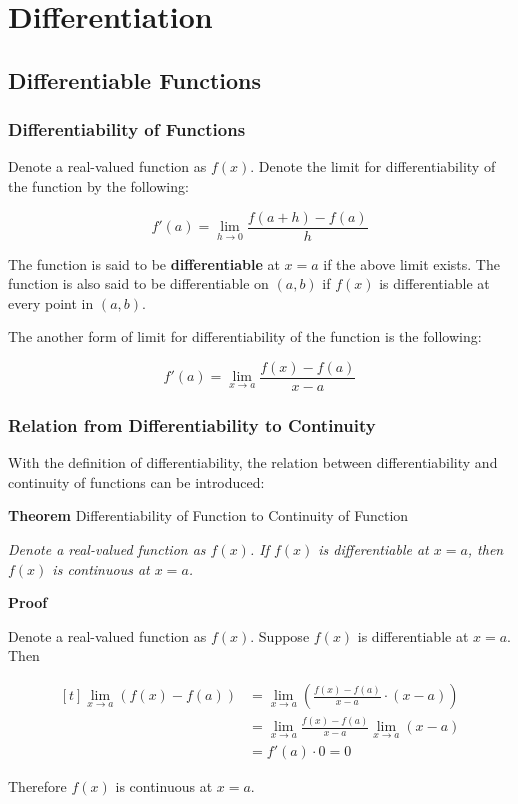 \documentclass[a4paper,12pt]{article}
\newcommand{\s}{\vspace{1mm}}
\newcommand{\n}{\vspace{3mm}}
\newenvironment{block}[4][Block]{ %
\begin{list}{}{
  \setlength{\leftmargin}{0mm}
  \setlength{\rightmargin}{0mm}
  \setlength{\topsep}{0mm}
  \setlength{\partopsep}{0mm}
  \parsep\parskip
  \setlength{\itemsep}{-\parsep}
  }
  \needspace{\baselineskip}
  \item \textbf{#2 #3} \hspace{1mm} #4
  \vspace{1mm}
  \item
  }
{
\end{list}
}
\begin{document}
\pagebreak

\section{Differentiation}
\subsection{Differentiable Functions}
\subsubsection{Differentiability of Functions}
Denote a real-valued function as $f(x)$. Denote the limit for differentiability of the function by the following:

$$f'(a)=\lim_{h\to 0}\frac{f(a+h)-f(a)}{h}$$\s

The function is said to be \textbf{differentiable} at $x=a$ if the above limit exists. The function is also said to be differentiable on $(a,b)$ if $f(x)$ is differentiable at every point in $(a,b)$.\n

The another form of limit for differentiability of the function is the following:

$$f'(a)=\lim_{x\to a}\frac{f(x)-f(a)}{x-a}$$

\subsubsection{Relation from Differentiability to Continuity}
With the definition of differentiability, the relation between differentiability and continuity of functions can be introduced:\n

\begin{block}{Theorem}{}{Differentiability of Function to Continuity of Function}
  \textit{Denote a real-valued function as $f(x)$. If $f(x)$ is differentiable at $x=a$, then $f(x)$ is continuous at $x=a$.}
\end{block}\n

\begin{block}{Proof}{}{}
  Denote a real-valued function as $f(x)$. Suppose $f(x)$ is differentiable at $x=a$. Then

  $$\begin{aligned}[t]
    \lim_{x\to a}(f(x)-f(a))&=\lim_{x\to a}(\frac{f(x)-f(a)}{x-a}\cdot (x-a))\\
    &=\lim_{x\to a}\frac{f(x)-f(a)}{x-a}\lim_{x\to a}(x-a)\\
    &=f'(a)\cdot 0=0
  \end{aligned}$$\s

  Therefore $f(x)$ is continuous at $x=a$.
\end{block}\n
\end{document}
